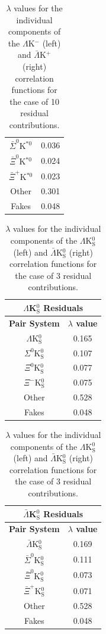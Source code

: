 \documentclass[../AnalysisNoteJBuxton.tex]{subfiles}
\begin{document}
\begin{table}[htbp]
\begin{minipage}{0.3\textwidth}
\begin{tabular}{|c|c|}
   $\bar{\Sigma}^{0}$K$^{*0}$ & 0.036 \\
   $\bar{\Xi}^{0}$K$^{*0}$ & 0.024 \\
   $\bar{\Xi}^{+}$K$^{*0}$ & 0.023 \\
   Other & 0.301 \\
   Fakes & 0.048 \\
   \hline
  \end{tabular}
 \end{minipage} 
 \caption{$\lambda$ values for the individual components of the $\Lambda$K$^{-}$ (left) and $\bar{\Lambda}$K$^{+}$ (right) correlation functions for the case of 10 residual contributions.}
 \label{tab:LambdaValues_10Res_LamKchM}
\end{table}


\clearpage
\begin{table}[htbp]
 \centering
 \begin{minipage}{0.3\textwidth}
  \centering
  \begin{tabular}{|c|c|}
   \multicolumn{2}{c}{$\Lambda$K$^{0}_{\mathrm{S}}$ Residuals} \\
   \hline
   \textbf{Pair System} & \textbf{$\lambda$ value} \\
   \hline
   $\Lambda$K$^{0}_{\mathrm{S}}$ & 0.165 \\
   $\Sigma^{0}$K$^{0}_{\mathrm{S}}$ & 0.107 \\
   $\Xi^{0}$K$^{0}_{\mathrm{S}}$ & 0.077 \\
   $\Xi^{-}$K$^{0}_{\mathrm{S}}$ & 0.075 \\
   Other & 0.528 \\
   Fakes & 0.048 \\
   \hline
  \end{tabular}
 \end{minipage}
 \begin{minipage}{0.3\textwidth}
  \centering
  \begin{tabular}{|c|c|}
   \multicolumn{2}{c}{$\bar{\Lambda}$K$^{0}_{\mathrm{S}}$ Residuals} \\
   \hline
   \textbf{Pair System} & \textbf{$\lambda$ value} \\
   \hline
   $\bar{\Lambda}$K$^{0}_{\mathrm{S}}$ & 0.169 \\
   $\bar{\Sigma}^{0}$K$^{0}_{\mathrm{S}}$ & 0.111 \\
   $\bar{\Xi}^{0}$K$^{0}_{\mathrm{S}}$ & 0.073 \\
   $\bar{\Xi}^{+}$K$^{0}_{\mathrm{S}}$ & 0.071 \\
   Other & 0.528 \\
   Fakes & 0.048 \\
   \hline
  \end{tabular}
 \end{minipage} 
 \caption{$\lambda$ values for the individual components of the $\Lambda$K$^{0}_{\mathrm{S}}$ (left) and $\bar{\Lambda}$K$^{0}_{\mathrm{S}}$ (right) correlation functions for the case of 3 residual contributions.}
 \label{tab:LambdaValues_3Res_LamK0}
\end{table}
\end{document}

